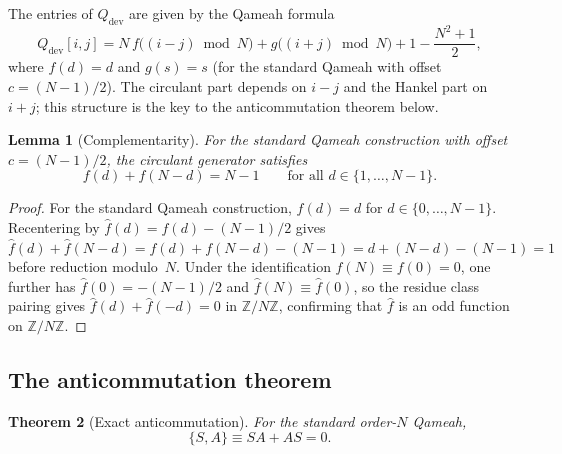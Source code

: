 \documentclass[aip,jmp,reprint,superscriptaddress,floatfix,nofootinbib]{revtex4-2}
\newtheorem{theorem}{Theorem}
\newtheorem{lemma}[theorem]{Lemma}
\theoremstyle{definition}
\theoremstyle{remark}
\begin{document}
The entries of $Q_{\mathrm{dev}}$ are given by the Qameah formula
\begin{equation}\label{eq:siamese-entry}
  Q_{\mathrm{dev}}[i,j]
  = N\,f\!\bigl((i{-}j) \bmod N\bigr)
    + g\!\bigl((i{+}j) \bmod N\bigr)
    + 1 - \frac{N^2+1}{2},
\end{equation}
where $f(d) = d$ and $g(s) = s$ (for the standard Qameah
with offset $c = (N{-}1)/2$).  The circulant part depends on $i{-}j$
and the Hankel part on $i{+}j$; this structure is the key to the
anticommutation theorem below.

\begin{lemma}[Complementarity]
\label{lem:complementarity}
For the standard Qameah construction with offset $c = (N{-}1)/2$,
the circulant generator satisfies
\begin{equation}\label{eq:complementarity}
  f(d) + f(N-d) = N - 1 \qquad \text{for all } d \in \{1,\ldots,N{-}1\}.
\end{equation}
\end{lemma}
\begin{proof}
For the standard Qameah construction, $f(d) = d$ for $d\in\{0,\ldots,N{-}1\}$.
Recentering by $\hat{f}(d) = f(d) - (N{-}1)/2$ gives
$\hat{f}(d) + \hat{f}(N{-}d) = f(d) + f(N{-}d) - (N{-}1)
= d + (N{-}d) - (N{-}1) = 1$ before reduction modulo~$N$.
Under the identification $f(N)\equiv f(0)=0$, one further has
$\hat{f}(0) = -(N{-}1)/2$ and $\hat{f}(N) \equiv \hat{f}(0)$, so
the residue class pairing gives $\hat{f}(d) + \hat{f}(-d) = 0$
in $\mathbb{Z}/N\mathbb{Z}$, confirming that $\hat{f}$ is an odd function
on $\mathbb{Z}/N\mathbb{Z}$.
\end{proof}

\subsection{The anticommutation theorem}

\begin{theorem}[Exact anticommutation]
\label{thm:anticommute}
For the standard order-$N$ Qameah,
\begin{equation}\label{eq:anticommute}
  \{S, A\} \equiv SA + AS = 0.
\end{equation}
\end{theorem}
\end{document}
